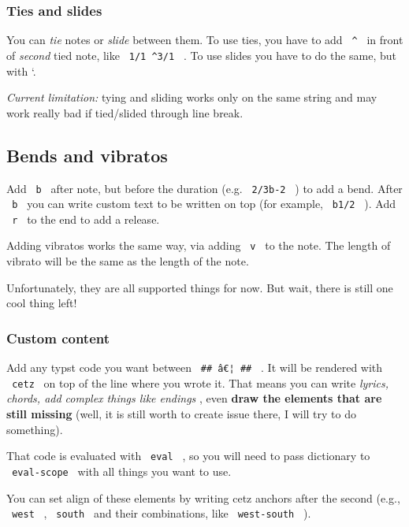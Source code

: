\subsubsection{Ties and slides}\label{ties-and-slides}

You can \emph{tie} notes or \emph{slide} between them. To use ties, you
have to add \texttt{\ \^{}\ } in front of \emph{second} tied note, like
\texttt{\ 1/1\ \^{}3/1\ } . To use slides you have to do the same, but
with `.

\emph{Current limitation:} tying and sliding works only on the same
string and may work really bad if tied/slided through line break.

\subsection{Bends and vibratos}\label{bends-and-vibratos}

Add \texttt{\ b\ } after note, but before the duration (e.g.
\texttt{\ 2/3b-2\ } ) to add a bend. After \texttt{\ b\ } you can write
custom text to be written on top (for example, \texttt{\ b1/2\ } ). Add
\texttt{\ r\ } to the end to add a release.

Adding vibratos works the same way, via adding \texttt{\ v\ } to the
note. The length of vibrato will be the same as the length of the note.

Unfortunately, they are all supported things for now. But wait, there is
still one cool thing left!

\subsubsection{Custom content}\label{custom-content}

Add any typst code you want between \texttt{\ \#\#\ â€¦\ \#\#\ } . It
will be rendered with \texttt{\ cetz\ } on top of the line where you
wrote it. That means you can write \emph{lyrics, chords, add complex
things like endings} , even \textbf{draw the elements that are still
missing} (well, it is still worth to create issue there, I will try to
do something).

That code is evaluated with \texttt{\ eval\ } , so you will need to pass
dictionary to \texttt{\ eval-scope\ } with all things you want to use.

You can set align of these elements by writing cetz anchors after the
second (e.g., \texttt{\ west\ } , \texttt{\ south\ } and their
combinations, like \texttt{\ west-south\ } ).

